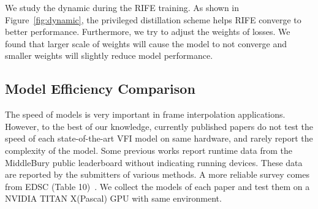 \documentclass[final]{cvpr}
\begin{document}
We study the dynamic during the RIFE training. As shown in Figure~\ref{fig:dynamic}, the privileged distillation scheme helps RIFE converge to better performance. Furthermore, we try to adjust the weights of losses. We found that larger scale of weights will cause the model to not converge and smaller weights will slightly reduce model performance.


\subsection{Model Efficiency Comparison}
The speed of models is very important in frame interpolation applications. However, to the best of our knowledge, currently published papers do not test the speed of each state-of-the-art VFI model on same hardware, and rarely report the complexity of the model. Some previous works  report runtime data from the MiddleBury public leaderboard without indicating running devices. These data are reported by the submitters of various methods. A more reliable survey comes from EDSC (Table 10)~\cite{cheng2020multiple}. We collect the models of each paper and test them on a NVIDIA TITAN X(Pascal) GPU with same environment. 
 
\end{document}
